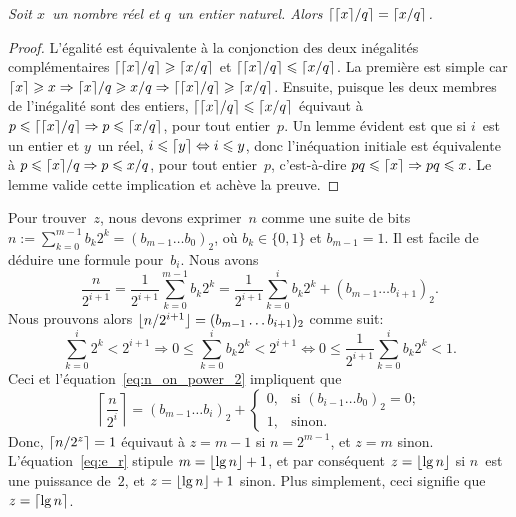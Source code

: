 \begin{itemize}
    \medskip

\begin{thm}
\label{thm_ceilings}
\textsl{Soit \(x\)~un nom\-bre réel et \(q\)~un entier naturel. Alors
  \(\lceil{\lceil{x}\rceil/q}\rceil = \lceil{x/q}\rceil\).}
\end{thm}
\begin{proof}
  L'égalité est équivalente à la conjonction des deux inégalités
  complémentaires \(\lceil{\lceil{x}\rceil/q}\rceil \geqslant \lceil{x/q}\rceil\)
  et \(\lceil{\lceil{x}\rceil/q}\rceil \leqslant \lceil{x/q}\rceil\). La première
  est simple car \(\lceil{x}\rceil \geqslant x \Rightarrow \lceil{x}\rceil/q
  \geqslant x/q \Rightarrow \lceil{\lceil{x}\rceil/q}\rceil \geqslant
  \lceil{x/q}\rceil\). Ensuite, puisque les deux membres de l'inégalité
  sont des entiers, \(\lceil{\lceil{x}\rceil/q}\rceil \leqslant
  \lceil{x/q}\rceil\) équivaut à \(p \leqslant \lceil{\lceil{x}\rceil/q}\rceil
  \Rightarrow p \leqslant \lceil{x/q}\rceil\), pour tout entier~\(p\). Un
  lemme évident est que si \(i\)~est un entier et \(y\)~un réel, \(i
  \leqslant \lceil{y}\rceil \Leftrightarrow i \leqslant y\), donc
  l'inéquation initiale est équivalente à \(p \leqslant \lceil{x}\rceil/q
  \Rightarrow p \leqslant x/q\), pour tout entier~\(p\), c'est-à-dire
  \(pq \leqslant \lceil{x}\rceil \Rightarrow pq \leqslant x\). Le lemme
  valide cette implication et achève la preuve.
 \end{proof}
    \noindent Pour trouver~\(z\), nous devons exprimer~\(n\) comme une
    suite de bits \(n :=\! \sum_{k=0}^{m-1}{b_k2^k} = (b_{m-1}\ldots
    b_0)_2\), où \(b_k \in \{0,1\}\) et \(b_{m-1} = 1\). Il est facile
    de déduire une formule pour~\(b_i\). Nous avons
    \begin{equation}
      \frac{n}{2^{i+1}}
      = \frac{1}{2^{i+1}}\sum_{k=0}^{m-1}{b_k2^{k}}
      = \frac{1}{2^{i+1}}\sum_{k=0}^{i}{b_k2^k} + (b_{m-1}\dots b_{i+1})_2.
      \label{eq:n_on_power_2}
    \end{equation}
    Nous prouvons alors \(\lfloor{n/2^{i+1}}\rfloor = (b_{m-1}\dots
    b_{i+1})_2\) comme suit:
    \begin{equation*}
      \sum_{k=0}^{i}{2^k} < 2^{i+1}
      \Rightarrow
      0 \leqslant \sum_{k=0}^{i}{b_k2^k} < 2^{i+1}
      \Leftrightarrow
      0 \leqslant \frac{1}{2^{i+1}}\sum_{k=0}^{i}{b_k2^k} < 1.
    \end{equation*}
    Ceci et l'équation~\eqref{eq:n_on_power_2} impliquent que
    \begin{equation*}
      \left\lceil\frac{n}{2^i}\right\rceil =
      (b_{m-1}\dots b_i)_2
      + \begin{cases}
          0, & \text{si \((b_{i-1}\dots b_0)_2=0\)};\\
          1, & \text{sinon}.
        \end{cases}
    \end{equation*}
    Donc, \(\lceil{n/2^z}\rceil = 1\) équivaut à \(z=m-1\) si
    \(n=2^{m-1}\), et \(z=m\) sinon. L'équation~\eqref{eq:e_r}
     stipule \(m = \lfloor{\lg n}\rfloor + 1\), et par
    conséquent \(z=\lfloor{\lg n}\rfloor\) si \(n\)~est une puissance
    de~\(2\), et \(z=\lfloor{\lg n}\rfloor + 1\) sinon. Plus simplement, ceci
    signifie que \(z=\lceil{\lg n}\rceil\).


\end{itemize}
